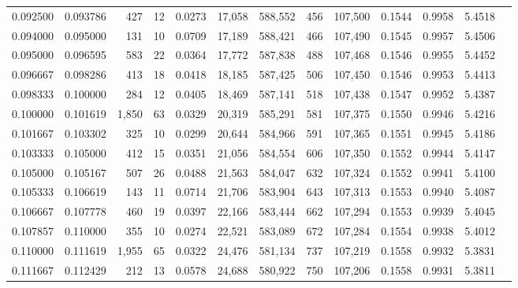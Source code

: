 \begin{tabular}{rrrrrrrrrrrrr}
0.092500 & 0.093786 &   427 &  12 &                                     0.0273 &  17,058 & 588,552 &     456 & 107,500 & 0.1544 & 0.9958 & 5.4518 \\
0.094000 & 0.095000 &   131 &  10 &                                     0.0709 &  17,189 & 588,421 &     466 & 107,490 & 0.1545 & 0.9957 & 5.4506 \\
0.095000 & 0.096595 &   583 &  22 &                                     0.0364 &  17,772 & 587,838 &     488 & 107,468 & 0.1546 & 0.9955 & 5.4452 \\
0.096667 & 0.098286 &   413 &  18 &                                     0.0418 &  18,185 & 587,425 &     506 & 107,450 & 0.1546 & 0.9953 & 5.4413 \\
0.098333 & 0.100000 &   284 &  12 &                                     0.0405 &  18,469 & 587,141 &     518 & 107,438 & 0.1547 & 0.9952 & 5.4387 \\
0.100000 & 0.101619 & 1,850 &  63 &                                     0.0329 &  20,319 & 585,291 &     581 & 107,375 & 0.1550 & 0.9946 & 5.4216 \\
0.101667 & 0.103302 &   325 &  10 &                                     0.0299 &  20,644 & 584,966 &     591 & 107,365 & 0.1551 & 0.9945 & 5.4186 \\
0.103333 & 0.105000 &   412 &  15 &                                     0.0351 &  21,056 & 584,554 &     606 & 107,350 & 0.1552 & 0.9944 & 5.4147 \\
0.105000 & 0.105167 &   507 &  26 &                                     0.0488 &  21,563 & 584,047 &     632 & 107,324 & 0.1552 & 0.9941 & 5.4100 \\
0.105333 & 0.106619 &   143 &  11 &                                     0.0714 &  21,706 & 583,904 &     643 & 107,313 & 0.1553 & 0.9940 & 5.4087 \\
0.106667 & 0.107778 &   460 &  19 &                                     0.0397 &  22,166 & 583,444 &     662 & 107,294 & 0.1553 & 0.9939 & 5.4045 \\
0.107857 & 0.110000 &   355 &  10 &                                     0.0274 &  22,521 & 583,089 &     672 & 107,284 & 0.1554 & 0.9938 & 5.4012 \\
0.110000 & 0.111619 & 1,955 &  65 &                                     0.0322 &  24,476 & 581,134 &     737 & 107,219 & 0.1558 & 0.9932 & 5.3831 \\
0.111667 & 0.112429 &   212 &  13 &                                     0.0578 &  24,688 & 580,922 &     750 & 107,206 & 0.1558 & 0.9931 & 5.3811 \\

\end{tabular}
